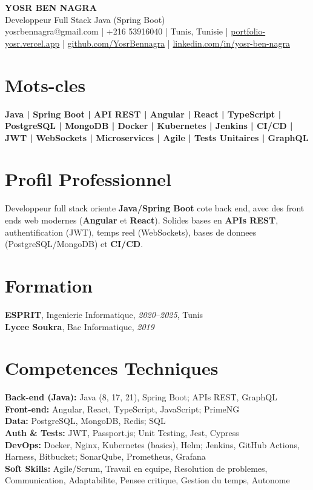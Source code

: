 \documentclass[10pt,a4paper]{article}
\begin{document}
\begin{center}
  {\Large\bfseries YOSR BEN NAGRA}\\[2pt]
  {\small Developpeur Full Stack Java (Spring Boot)}\\[3pt]
  {\footnotesize yosrbennagra@gmail.com \;|\; +216 53916040 \;|\; Tunis, Tunisie \;|\; \href{https://portfolio-yosr.vercel.app/en}{portfolio-yosr.vercel.app} \;|\; \href{https://github.com/YosrBennagra}{github.com/YosrBennagra} \;|\; \href{https://www.linkedin.com/in/yosr-ben-nagra/}{linkedin.com/in/yosr-ben-nagra}}
\end{center}

\section*{Mots-cles}
{\small\textbf{
Java | Spring Boot | API REST | Angular | React | TypeScript | PostgreSQL | MongoDB | Docker | Kubernetes | Jenkins | CI/CD | JWT | WebSockets | Microservices | Agile | Tests Unitaires | GraphQL
}}

\vspace{4pt}

\section*{Profil Professionnel}
{\small
Developpeur full stack oriente \textbf{Java/Spring Boot} cote back end, avec des front ends web modernes (\textbf{Angular} et \textbf{React}). Solides bases en \textbf{APIs REST}, authentification (JWT), temps reel (WebSockets), bases de donnees (PostgreSQL/MongoDB) et \textbf{CI/CD}.
}

\vspace{4pt}

\section*{Formation}
{\small
\textbf{ESPRIT}, Ingenierie Informatique, \textit{2020--2025}, Tunis\\[1pt]
\textbf{Lycee Soukra}, Bac Informatique, \textit{2019}
}

\vspace{4pt}

\section*{Competences Techniques}
{\small
\textbf{Back-end (Java):} Java (8, 17, 21), Spring Boot; APIs REST, GraphQL\\[2pt]
\textbf{Front-end:} Angular, React, TypeScript, JavaScript; PrimeNG\\[2pt]
\textbf{Data:} PostgreSQL, MongoDB, Redis; SQL\\[2pt]
\textbf{Auth \& Tests:} JWT, Passport.js; Unit Testing, Jest, Cypress\\[2pt]
\textbf{DevOps:} Docker, Nginx, Kubernetes (basics), Helm; Jenkins, GitHub Actions, Harness, Bitbucket; SonarQube, Prometheus, Grafana\\[2pt]
\textbf{Soft Skills:} Agile/Scrum, Travail en equipe, Resolution de problemes, Communication, Adaptabilite, Pensee critique, Gestion du temps, Autonome
}
\end{document}
